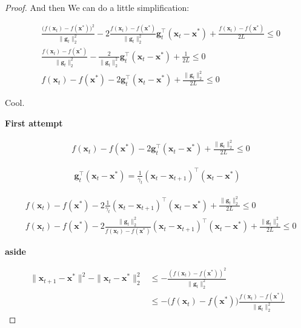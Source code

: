\documentclass{article}
\begin{document}
\begin{proof}
	And then We can do a little simplification:
	
	\begin{align}
		&\frac{\big( f(\mathbf{x}_t) - f(\mathbf{x}^*) \big)^2}{\|\mathbf{g}_t\|^2_2} - 2 \frac{f(\mathbf{x}_t) - f(\mathbf{x}^*) }{\|\mathbf{g}_t\|^2_2}\mathbf{g}^\top_t(\mathbf{x}_t - \mathbf{x}^*) + \frac{f(\mathbf{x}_t) - f(\mathbf{x}^*) }{2L}  \le 0\\
		&\frac{ f(\mathbf{x}_t) - f(\mathbf{x}^*)}{\|\mathbf{g}_t\|^2_2} - \frac{2}{\|\mathbf{g}_t\|^2_2}\mathbf{g}^\top_t(\mathbf{x}_t - \mathbf{x}^*) + \frac{1}{2L}  \le 0\\
		 &f(\mathbf{x}_t) - f(\mathbf{x}^*) - 2\mathbf{g}^\top_t(\mathbf{x}_t - \mathbf{x}^*) + \frac{\|\mathbf{g}_t\|^2_2}{2L}  \le 0
	\end{align}
	
	Cool.
	
	\textbf{First attempt}
	
	\begin{align}
		&f(\mathbf{x}_t) - f(\mathbf{x}^*) - 2\mathbf{g}^\top_t(\mathbf{x}_t - \mathbf{x}^*) + \frac{\|\mathbf{g}_t\|^2_2}{2L}  \le 0
	\end{align}
	
	\begin{align}
		\mathbf{g}_t^\top(\mathbf{x}_t - \mathbf{x}^*) = \frac{1}{\gamma_t}(\mathbf{x}_t - \mathbf{x}_{t+1})^\top (\mathbf{x}_t - \mathbf{x}^*)
	\end{align}
	
	\begin{align}
		&f(\mathbf{x}_t) - f(\mathbf{x}^*) - 2\frac{1}{\gamma_t}(\mathbf{x}_t - \mathbf{x}_{t+1})^\top (\mathbf{x}_t - \mathbf{x}^*) + \frac{\|\mathbf{g}_t\|^2_2}{2L}  \le 0\\
		&f(\mathbf{x}_t) - f(\mathbf{x}^*) - 2\frac{\|\mathbf{g}_t\|^2_2}{f(\mathbf{x}_t) - f(\mathbf{x}^*)}(\mathbf{x}_t - \mathbf{x}_{t+1})^\top (\mathbf{x}_t - \mathbf{x}^*) + \frac{\|\mathbf{g}_t\|^2_2}{2L}  \le 0
	\end{align}
	
	\textbf{aside}

	\begin{align}
		\|\mathbf{x}_{t+1} - \mathbf{x}^*\|^2 - \|\mathbf{x}_t - \mathbf{x}^*\|^2_2 &\le - \frac{(f(\mathbf{x}_t) - f(\mathbf{x}^*))^2}{\|\mathbf{g}_t\|^2_2}\\
		&\le - \big( f(\mathbf{x}_t) - f(\mathbf{x}^*) \big) \frac{f(\mathbf{x}_t) - f(\mathbf{x}^*)}{\|\mathbf{g}_t\|^2_2}
	\end{align}
	

\end{proof}
\end{document}
